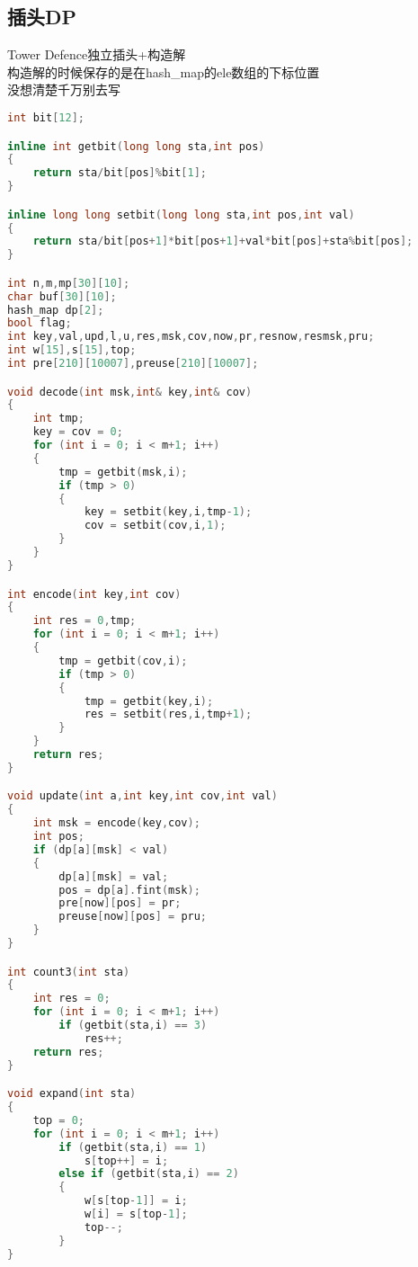 \subsection{插头DP}
	Tower Defence独立插头+构造解\\
	构造解的时候保存的是在hash\_map的ele数组的下标位置\\
	没想清楚千万别去写\\
	\begin{lstlisting}[language=c++]
int bit[12];

inline int getbit(long long sta,int pos)
{
	return sta/bit[pos]%bit[1];
}

inline long long setbit(long long sta,int pos,int val)
{
	return sta/bit[pos+1]*bit[pos+1]+val*bit[pos]+sta%bit[pos];
}

int n,m,mp[30][10];
char buf[30][10];
hash_map dp[2];
bool flag;
int key,val,upd,l,u,res,msk,cov,now,pr,resnow,resmsk,pru;
int w[15],s[15],top;
int pre[210][10007],preuse[210][10007];

void decode(int msk,int& key,int& cov)
{
	int tmp;
	key = cov = 0;
	for (int i = 0; i < m+1; i++)
	{
		tmp = getbit(msk,i);
		if (tmp > 0)
		{
			key = setbit(key,i,tmp-1);
			cov = setbit(cov,i,1);
		}
	}
}

int encode(int key,int cov)
{
	int res = 0,tmp;
	for (int i = 0; i < m+1; i++)
	{
		tmp = getbit(cov,i);
		if (tmp > 0)
		{
			tmp = getbit(key,i);
			res = setbit(res,i,tmp+1);
		}
	}
	return res;
}

void update(int a,int key,int cov,int val)
{
	int msk = encode(key,cov);
	int pos;
	if (dp[a][msk] < val)
	{
		dp[a][msk] = val;
		pos = dp[a].fint(msk);
		pre[now][pos] = pr;
		preuse[now][pos] = pru;
	}
}

int count3(int sta)
{
	int res = 0;
	for (int i = 0; i < m+1; i++)
		if (getbit(sta,i) == 3)
			res++;
	return res;
}

void expand(int sta)
{
	top = 0;
	for (int i = 0; i < m+1; i++)
		if (getbit(sta,i) == 1)
			s[top++] = i;
		else if (getbit(sta,i) == 2)
		{
			w[s[top-1]] = i;
			w[i] = s[top-1];
			top--;
		}
}


\end{lstlisting}
